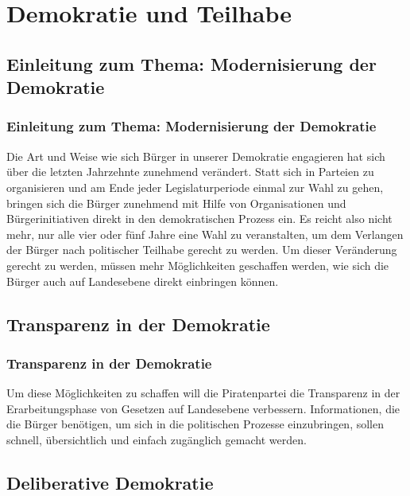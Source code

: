 \section{Demokratie und Teilhabe}

\subsection*{Einleitung zum Thema: Modernisierung der Demokratie}

\subsubsection{Einleitung zum Thema: Modernisierung der Demokratie}
\abstimmung
Die Art und Weise wie sich Bürger in unserer Demokratie engagieren hat sich über die letzten Jahrzehnte zunehmend verändert. Statt sich in Parteien zu organisieren und am Ende jeder Legislaturperiode einmal zur Wahl zu gehen, bringen sich die Bürger zunehmend mit Hilfe von Organisationen und Bürgerinitiativen direkt in den demokratischen Prozess ein. Es reicht also nicht mehr, nur alle vier oder fünf Jahre eine Wahl zu veranstalten, um dem Verlangen der Bürger nach politischer Teilhabe gerecht zu werden. Um dieser Veränderung gerecht zu werden, müssen mehr Möglichkeiten geschaffen werden, wie sich die Bürger auch auf Landesebene direkt einbringen können.
 
\subsection*{Transparenz in der Demokratie}

\subsubsection{Transparenz in der Demokratie}
\abstimmung
Um diese Möglichkeiten zu schaffen will die Piratenpartei die Transparenz in der Erarbeitungsphase von Gesetzen auf Landesebene verbessern. Informationen, die die Bürger benötigen, um sich in die politischen Prozesse einzubringen, sollen schnell, übersichtlich und einfach zugänglich gemacht werden.
 
\subsection*{Deliberative Demokratie}

